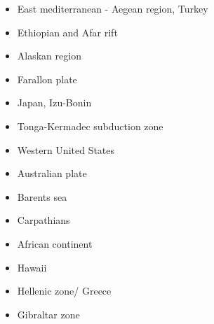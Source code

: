 \begin{itemize}
\cite{bovt14}\cite{vagw14}
\item{East mediterranean - Aegean region, Turkey} 
\cite{cazf10}
\item{Ethiopian and Afar rift} 
\cite{mitk07}
\cite{cort08}
\cite{kekj09}
\cite{beve10}
\cite{phcs14}
\cite{brcr17}
\cite{brcg17}
\cite{cocf19}
\item{Alaskan region} 
\cite{jabi12}
\cite{jabr13}
\cite{haja17}
\cite{mimo18}
\item{Farallon plate} 
\cite{lisg08}
\cite{list11}
\cite{list12}
\item{Japan, Izu-Bonin}  
\cite{lohd07}\cite{kigk14}\cite{leli14}\cite{kilk15}\cite{yagz17}\cite{yamg19}
\item{Tonga-Kermadec subduction zone} 
\cite{bigs03}\cite{bigu03}
\item{Western United States}
\cite{besb06}
\item Australian plate 
\cite{himu03}\cite{wemv03}
\cite{hazs10}\cite{dimg10}
\cite{mahg11}\cite{digm11}
\cite{scsp15}
\item Barents sea 
\cite{buto07b}
\cite{gahs14}
\item Carpathians 
\cite{clbm04}
\cite{sepg19}
\item African continent 
\cite{vabt11}
\cite{busm12}
\item Hawaii 
\cite{tabs09}
\item Hellenic zone/ Greece 
\cite{spwv88}
\item Gibraltar zone
\cite{gumr02} 

\end{itemize}






